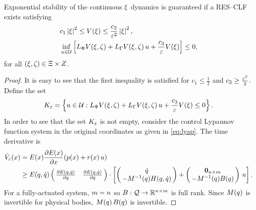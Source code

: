 \begin{proposition}  
  \label{prop:res-clf}
  Exponential stability of the continuous $\xi$ dynamics is guaranteed if a
  RES--CLF exists satisfying
  \begin{eqnarray}
    \label{eq:lyap-cond-nrg-es}
    &c_{1} \left|\xi\right|^{2} \leq V(\xi) \leq \frac{c_{2}}{\varepsilon^{2}} \left|\xi\right|^2,\\
    \nonumber
    &\inf_{u \in \mathcal{U}} \left[ L_{\Phi} V(\xi, \zeta) + L_{\Gamma} V(\xi, \zeta) \, u + \frac{c_{3}}{\varepsilon} V(\xi) \right] \leq 0,
  \end{eqnarray}
  for all $(\xi, \zeta) \in \Xi \times Z$.\vgap
\end{proposition}


\begin{proof}
  It is easy to see that the first inequality is satisfied for $c_{1} \leq
  \frac{1}{2}$ and $c_{2} \geq \frac{\varepsilon^{2}}{2}$.
  Define the set
  \begin{align}
    K_{\varepsilon} = \left\{ u \in \mathcal{U} : L_{\Phi} V(\xi, \zeta) + L_{\Gamma} V(\xi, \zeta)
      \, u + \frac{c_{3}}{\varepsilon} V(\xi) \leq 0 \right\}.
    \label{eq:control-set}
  \end{align}
  In order to see that the set $K_{\varepsilon}$ is not empty, consider the control
  Lypaunov function system in the original coordinates as given in
  \eqref{eq:lyap}.
  The time derivative is
  \begin{align*}
    \dVe(\x) &= \E(\x) \pd{\E(\x)}{\x}(\rff(\x) + \rfg(\x) \, \uu)\\
    &\geq \E(\q, \dq) \left(\!\!\begin{array}{c c}
        \pd{\E(\q, \dq)}{\q} & \pd{\E(\q, \dq)}{\dq}
      \end{array}\!\!\right) \cdot
    \left[
      \left(\!\!\begin{array}{c}
          \dq\\
          -\M^{-1}(\q) \CG(\q, \dq)
        \end{array}\!\!\right) +
      \left(\!\!\begin{array}{c}
          \boldzero_{\ndim \times \ncv}\\
          -\M^{-1}(\q) \B(\q)
        \end{array}\!\!\right) \, \uu
    \right].
  \end{align*}
  For a fully-actuated system, $m = n$ so $B : \mathcal{Q} \to \mathbb{R}^{n \times
    m}$ is full rank.
  Since $M(q)$ is invertible for physical bodies, $M(q) \, B(q)$ is invertible.

\end{proof}
